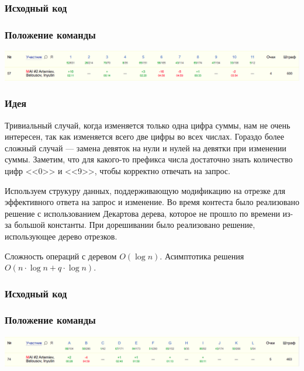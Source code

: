 \subsubsection*{Исходный код}

\subsubsection*{Положение команды}
\includegraphics[scale=0.25]{images/gp_siberia.png}\newline\noindent
\pagebreak


\subsubsection*{Идея}
Тривиальный случай, когда изменяется только одна цифра суммы, нам не очень интересен, так как изменяется всего две цифры во всех числах. Гораздо более сложный случай --- замена девяток на нули и нулей на девятки при изменении суммы. Заметим, что для какого-то префикса числа достаточно знать количество цифр <<0>> и <<9>>, чтобы корректно отвечать на запрос.

Используем струкуру данных, поддерживающую модификацию на отрезке для эффективного ответа на запрос и изменение. Во время контеста было реализовано решение с использованием Декартова дерева, которое не прошло по времени из-за большой константы. При дорешивании было реализовано решение, использующее дерево отрезков.

Сложность операций с деревом $O(\log{n})$. Асимптотика решения $O(n \cdot \log{n} + q \cdot \log{n})$.

\subsubsection*{Исходный код}

\subsubsection*{Положение команды}
\includegraphics[scale=0.25]{images/gp_edg.png}\newline\noindent
\pagebreak

